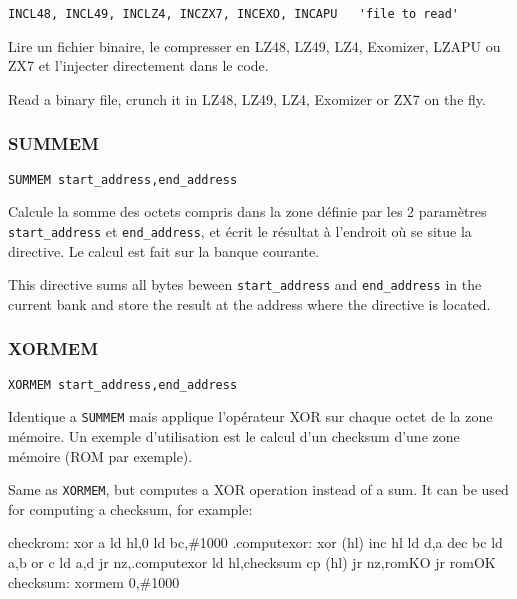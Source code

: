 \begin{verbatim}
INCL48, INCL49, INCLZ4, INCZX7, INCEXO, INCAPU   'file to read'
\end{verbatim}

\begin{xfr}
Lire un fichier binaire, le compresser en LZ48, LZ49, LZ4, Exomizer, LZAPU  ou ZX7 et l'injecter directement dans le code.
\end{xfr}

\begin{xen}
Read a binary file, crunch it in LZ48, LZ49, LZ4, Exomizer or ZX7 on the fly.
\end{xen}


\subsubsection{SUMMEM}
\begin{verbatim}
SUMMEM start_address,end_address
\end{verbatim}
\begin{xfr}
  Calcule la somme des octets compris dans la zone définie par les 2 paramètres
  \texttt{start\_address} et \texttt{end\_address},
  et écrit le résultat à l'endroit où se situe la directive.
  Le calcul est fait sur la banque courante.
\end{xfr}

\begin{xen}
This directive sums all bytes beween \texttt{start\_address} and \texttt{end\_address} in the current bank
and store the result at the address where the directive is located.
\end{xen}


\subsubsection{XORMEM}
\begin{verbatim}
XORMEM start_address,end_address
\end{verbatim}

\begin{xfr}
  Identique a \texttt{SUMMEM} mais applique l'opérateur XOR sur chaque octet de la zone mémoire.
  Un exemple d'utilisation est le calcul d'un checksum d'une zone mémoire (ROM par exemple).
\end{xfr}

\begin{xen}
Same as \texttt{XORMEM}, but computes a XOR operation instead of a sum.
It can be used for computing a checksum, for example:
\end{xen}


\begin{code}
checkrom:
  xor a
  ld hl,0
  ld bc,\#1000
.computexor:
  xor (hl)
  inc hl
  ld d,a
  dec bc
  ld a,b
  or c
  ld a,d
  jr nz,.computexor
  ld hl,checksum
  cp (hl)
  jr nz,romKO
  jr romOK
checksum:
   xormem 0,\#1000
\end{code}
